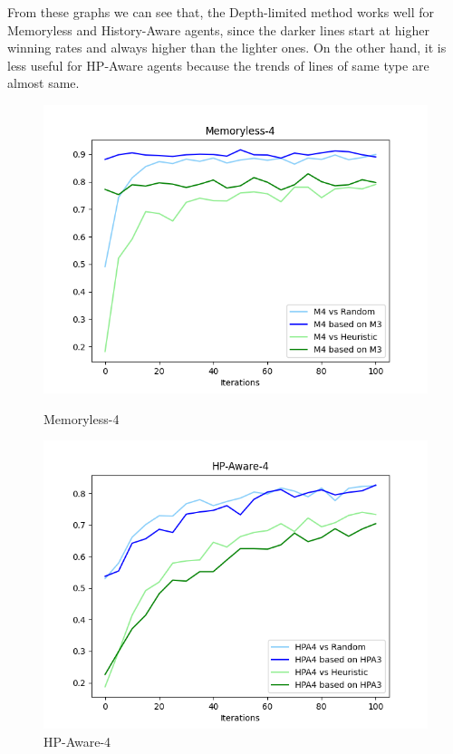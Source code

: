 \documentclass[runningheads]{llncs}
\begin{document}
    From these graphs we can see that, the Depth-limited method works well for Memoryless and History-Aware agents, since the darker lines start at higher winning rates and always higher than the lighter ones. On the other hand, it is less useful for HP-Aware agents because the trends of lines of same type are almost same.

    \begin{figure}[htbp]
    \centering
        \begin{minipage}[t]{0.48\textwidth}
        \centering
    	\includegraphics[width=\linewidth]{M4.png}
     	\caption{Memoryless-4}
     	\label{fig:M4}
    \end{minipage}
            \begin{minipage}[t]{0.48\textwidth}
        \centering
    	\includegraphics[width=\linewidth]{HPA4.png}
     	\caption{HP-Aware-4}
     	\label{fig:HPA4}
    \end{minipage}

    \end{figure}
    
\end{document}
